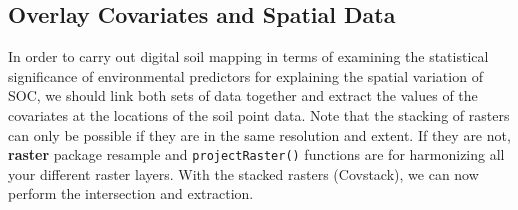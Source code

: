\documentclass[10pt,b5paper,]{book}
\newenvironment{Shaded}{\begin{snugshade}}{\end{snugshade}}
\newcommand{\CommentTok}[1]{\textcolor[rgb]{0.56,0.35,0.01}{\textit{#1}}}
\newcommand{\DataTypeTok}[1]{\textcolor[rgb]{0.13,0.29,0.53}{#1}}
\newcommand{\ErrorTok}[1]{\textcolor[rgb]{0.64,0.00,0.00}{\textbf{#1}}}
\newcommand{\KeywordTok}[1]{\textcolor[rgb]{0.13,0.29,0.53}{\textbf{#1}}}
\newcommand{\NormalTok}[1]{#1}
\newcommand{\OperatorTok}[1]{\textcolor[rgb]{0.81,0.36,0.00}{\textbf{#1}}}
\newcommand{\OtherTok}[1]{\textcolor[rgb]{0.56,0.35,0.01}{#1}}
\newcommand{\StringTok}[1]{\textcolor[rgb]{0.31,0.60,0.02}{#1}}
\theoremstyle{definition}
\theoremstyle{definition}
\theoremstyle{definition}
\theoremstyle{remark}
\begin{document}
\hypertarget{overlay-covariates-and-spatial-data}{%
\subsection{Overlay Covariates and Spatial
Data}\label{overlay-covariates-and-spatial-data}}

In order to carry out digital soil mapping in terms of examining the
statistical significance of environmental predictors for explaining the
spatial variation of SOC, we should link both sets of data together and
extract the values of the covariates at the locations of the soil point
data. Note that the stacking of rasters can only be possible if they are
in the same resolution and extent. If they are not, \textbf{raster}
package resample and \texttt{projectRaster()} functions are for
harmonizing all your different raster layers. With the stacked rasters
(Covstack), we can now perform the intersection and extraction.

\begin{Shaded}
\end{Shaded}
\end{document}
